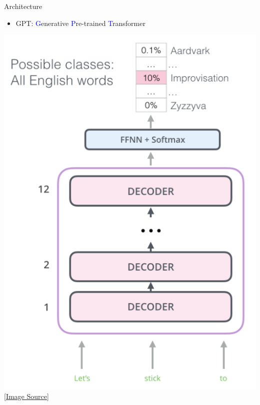 \begin{frame}[fragile]{Architecture}

    \begin{itemize}
        \item GPT: \textcolor{blue}{G}enerative \textcolor{blue}{P}re-trained \textcolor{blue}{T}ransformer \cite{radford2018improving}
    \end{itemize}

    \begin{center}
        \includegraphics[scale=0.25]{../images/img_10.png} \\
        \href{http://jalammar.github.io/illustrated-bert/}{[Image Source]}
    \end{center}

\end{frame}